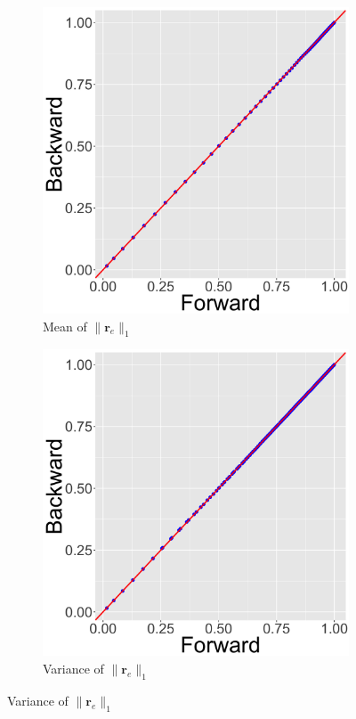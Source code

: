 \documentclass[ba]{imsart}
\numberwithin{equation}{section}
\theoremstyle{plain}
\begin{document}
	\begin{figure}[!t]
		\centering
		\begin{subfigure}[b]{0.2425\textwidth}
			\caption{Mean of $\lVert \boldsymbol{r}_{e} \rVert_1 $}
			\includegraphics[width=\textwidth]{img/plot1.png}	
		\end{subfigure}
		\begin{subfigure}[b]{0.2425\textwidth}
			\caption{Variance of $\lVert \boldsymbol{r}_{e} \rVert_1 $}
			\includegraphics[width=\textwidth]{img/plot2.png}	

\end{subfigure}
\end{figure}
\end{document}
